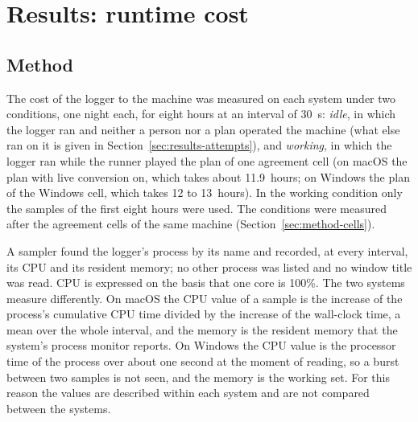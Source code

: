 
\section{Results: runtime cost}
\label{sec:cost}

\subsection{Method}
\label{sec:cost-method}

The cost of the logger to the machine was measured on each system under two conditions, one night each, for eight
hours at an interval of 30~s: \emph{idle}, in which the logger ran and neither a person nor a plan operated the machine
(what else ran on it is given in Section~\ref{sec:results-attempts}), and
\emph{working}, in which the logger ran while the runner played the plan of one agreement cell (on macOS the plan with
live conversion on, which takes about 11.9~hours; on Windows the plan of the Windows cell, which takes 12 to
13~hours). In the working condition only the samples of the first eight hours were used. The conditions were measured
after the agreement cells of the same machine (Section~\ref{sec:method-cells}).

A sampler found the logger's process by its name and recorded, at every interval, its CPU and its resident memory; no
other process was listed and no window title was read. CPU is expressed on the basis that one core is 100\%. The two
systems measure differently. On macOS the CPU value of a sample is the increase of the process's cumulative CPU time
divided by the increase of the wall-clock time, a mean over the whole interval, and the memory is the resident memory
that the system's process monitor reports. On Windows the CPU value is the processor time of the process over about
one second at the moment of reading, so a burst between two samples is not seen, and the memory is the working set.
For this reason the values are described within each system and are not compared between the systems.


